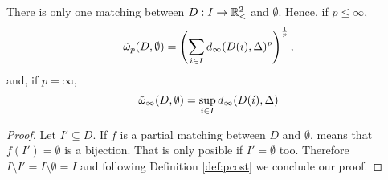 \begin{proposition} \label{prop-empty-mathing-distance}
    There is only one matching between $ D: I \to \mathbb{R}_<^2 $ and $ \emptyset $. Hence, if $ p \leq \infty $,
    \begin{equation}
        \tilde \omega_p(D, \emptyset) = \left(\sum_{i\in I} d_\infty(D(i), \Delta)^p\right)^{\frac{1}{p}},
    \end{equation}
    and, if $ p = \infty $,
    \begin{equation}
        \tilde \omega_\infty(D, \emptyset) = \sup_{i\in I} d_\infty(D(i), \Delta)
    \end{equation}
\end{proposition}
\begin{proof}
    Let $ I' \subseteq D $. If $ f $ is a partial matching between $ D $ and $ \emptyset $, means that $ f(I') = \emptyset$ is a bijection. That is only posible if $ I' = \emptyset $ too. Therefore $ I \setminus I' = I \setminus \emptyset = I $ and following Definition \ref{def:pcost} we conclude our proof.
\end{proof}

